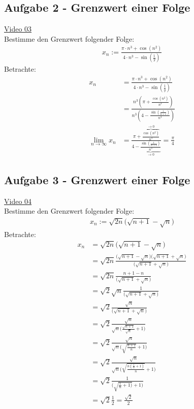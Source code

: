 \subsection{Aufgabe 2 - Grenzwert einer Folge}
\href{https://youtu.be/360OQSMzKcc}{Video 03}\\
Bestimme den Grenzwert folgender Folge:\\
\begin{align*}
x_n:=\frac{\pi\cdot n^3+\cos(n^2)}{4\cdot n^3-\sin(\frac{1}{y})}
\end{align*}
Betrachte:\\
\begin{align*}
x_n&=\frac{\pi\cdot n^3+\cos(n^2)}{4\cdot n^3-\sin(\frac{1}{y})}\\
&=\frac{n^3(\pi+\frac{\cos(n^2)}{n^3})}{n^3(4-\frac{\sin(\frac{1}{n+1})}{n^3})}\\
\lim\limits_ {n\to\infty} x_n&=\frac{\pi+\overbrace {\frac{\cos(n^2)}{n^3}}^{\rightarrow 0}}{4-\underbrace{\frac{\sin(\frac{1}{n+1})}{n^3}}_{\rightarrow 0}}=\frac{\pi}{4}
\end{align*}
\newpage
\noindent
\subsection{Aufgabe 3 - Grenzwert einer Folge}
\href{https://youtu.be/ICQcFrINxAQ}{Video 04}\\
Bestimme den Grenzwert folgender Folge:\\
\begin{align*}
x_n:=\sqrt{2n}\big(\sqrt{n+1}-\sqrt{n}\big)
\end{align*}
Betrachte:\\
\begin{align*}
x_n&=\sqrt{2n}\big(\sqrt{n+1}-\sqrt{n}\big)\\
&=\sqrt{2n}\frac{\big(\sqrt{n+1}-\sqrt{n}\big)\big(\sqrt{n+1}+\sqrt{n}\big)}{\big(\sqrt{n+1}+\sqrt{n}\big)}\\
&=\sqrt{2n}\frac{n+1-n}{\big(\sqrt{n+1}+\sqrt{n}\big)}\\
&=\sqrt{2}\sqrt{n}\frac{1}{\big(\sqrt{n+1}+\sqrt{n}\big)}\\
&=\sqrt{2}\frac{\sqrt{n}}{\big(\sqrt{n+1}+\sqrt{n}\big)}\\
&=\sqrt{2}\frac{\sqrt{n}}{\sqrt{n}\bigg(\frac{\sqrt{n+1}}{\sqrt{n}}+1\bigg)}\\
&=\sqrt{2}\frac{\sqrt{n}}{\sqrt{n}\bigg(\sqrt{\frac{n+1}{n}}+1\bigg)}\\
&=\sqrt{2}\frac{\sqrt{n}}{\sqrt{n}\bigg(\sqrt{\frac{n(\frac{1}{n}+1)}{n}}+1\bigg)}\\
&=\sqrt{2}\frac{1}{\bigg(\sqrt{\frac{1}{n}+1)}+1\bigg)}\\
&=\sqrt{2}\frac{1}{2}=\frac{\sqrt{2}}{2}
\end{align*}
